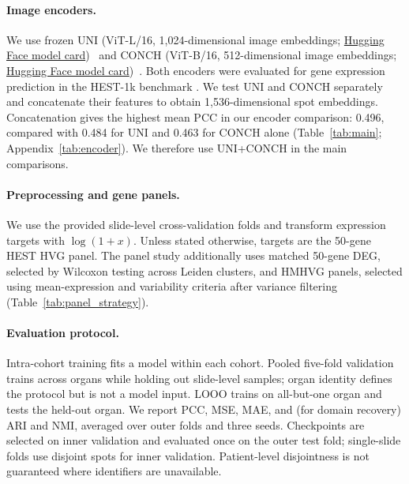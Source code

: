 \documentclass[11pt]{article}
\begin{document}
\paragraph{Image encoders.}
We use frozen UNI (ViT-L/16, 1,024-dimensional image embeddings;
\href{https://huggingface.co/MahmoodLab/UNI}{Hugging Face model card})~\cite{chen2024uni} and
CONCH (ViT-B/16, 512-dimensional image embeddings;
\href{https://huggingface.co/MahmoodLab/CONCH}{Hugging Face model card})~\cite{lu2024conch}.
Both encoders were evaluated for gene expression prediction in the HEST-1k benchmark
\cite{jaume2024hest}. We test UNI and CONCH separately and concatenate their features to obtain
1,536-dimensional spot embeddings. Concatenation gives the highest mean PCC in our encoder
comparison: 0.496, compared with 0.484 for UNI and 0.463 for CONCH alone (Table~\ref{tab:main};
Appendix~\ref{tab:encoder}). We therefore use UNI+CONCH in the main comparisons.

\paragraph{Preprocessing and gene panels.}
We use the provided slide-level cross-validation folds and transform expression targets with $\log(1+x)$.
Unless stated otherwise, targets are the 50-gene HEST HVG panel. The panel study additionally uses
matched 50-gene DEG, selected by Wilcoxon testing across Leiden clusters, and HMHVG panels, selected
using mean-expression and variability criteria after variance filtering (Table~\ref{tab:panel_strategy}).

\paragraph{Evaluation protocol.}
Intra-cohort training fits a model within each cohort. Pooled five-fold validation trains across
organs while holding out slide-level samples; organ identity defines the protocol but is not a model
input. LOOO trains on all-but-one organ and tests the held-out organ. We report PCC, MSE, MAE, and
(for domain recovery) ARI and NMI, averaged over outer folds and three seeds. Checkpoints are selected on inner validation and evaluated
once on the outer test fold; single-slide folds use disjoint spots for inner validation. Patient-level
disjointness is not guaranteed where identifiers are unavailable.
\end{document}
